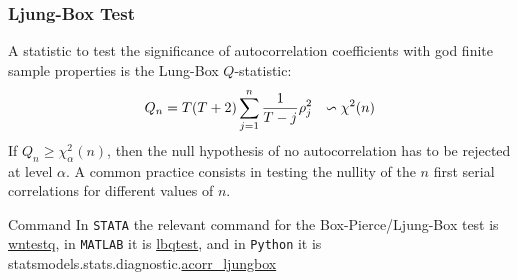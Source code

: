 \documentclass[xcolor=dvipsnames, english, 8pt]{beamer}
\begin{document}
%

\begin{frame}
    \frametitle{Ljung-Box Test}
    A statistic to test the significance of autocorrelation coefficients with god finite sample properties is the {\color{ubRed} Lung-Box $Q$-statistic}:\begin{align}
    Q_n = T(T+2)\sum\limits_{j=1}^n \frac{1}{T-j}\rho_j^2 \hspace{0.25cm} \backsim \chi^2(n)
\end{align}
     If $Q_n \geq \chi_{\alpha}^2(n)$, then the null hypothesis of no autocorrelation has to be rejected at level $\alpha$. A common practice consists in testing the nullity of the $n$ first serial correlations for different values of $n$.
    \vfill
    \begin{exampleblock}{{\small{Command}}}
    In  \texttt{STATA} the relevant command for the Box-Pierce/Ljung-Box test is \href{https://www.stata.com/manuals13/tswntestq.pdf}{\color{Purple}wntestq}, in \texttt{MATLAB} it is \href{https://ch.mathworks.com/help/econ/lbqtest.html}{\color{Purple}lbqtest}, and in \texttt{Python} it is statsmodels.stats.diagnostic.\href{https://www.statsmodels.org/stable/generated/statsmodels.stats.diagnostic.acorr_ljungbox.html}{\color{Purple}acorr\_ljungbox}
    \end{exampleblock}
\end{frame}
\end{document}
